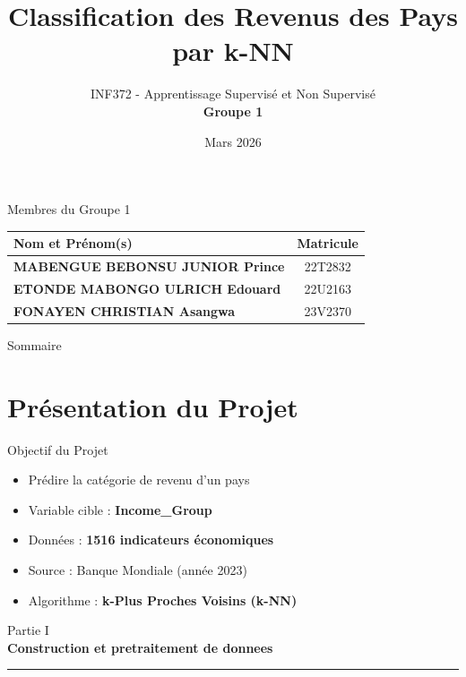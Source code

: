 \documentclass{beamer}
\title[Classification Income Group]{Classification des Revenus des Pays \\ par k-NN}
\author{INF372 - Apprentissage Supervisé et Non Supervisé \\ \textbf{Groupe 1}}
\institute{Université de Yaoundé 1 \\ Département d'Informatique}
\date{Mars 2026}
\begin{document}
\begin{frame}
\titlepage
\end{frame}

\begin{frame}{Membres du Groupe 1}
\centering
\vspace{0.4cm}
\begin{tabular}{>{\bfseries}l c}
\toprule
\textbf{Nom et Prénom(s)} & \textbf{Matricule} \\
\midrule
MABENGUE BEBONSU JUNIOR Prince   & 22T2832 \\[0.4cm]
ETONDE MABONGO ULRICH Edouard    & 22U2163 \\[0.4cm]
FONAYEN CHRISTIAN Asangwa        & 23V2370 \\
\bottomrule
\end{tabular}
\end{frame}

\begin{frame}{Sommaire}
\tableofcontents
\end{frame}


\section{Présentation du Projet}

\begin{frame}{Objectif du Projet}
\begin{itemize}
\item Prédire la catégorie de revenu d'un pays
\item Variable cible : \textbf{Income\_Group}
\item Données : \textbf{1516 indicateurs économiques}
\item Source : Banque Mondiale (année 2023)
\item Algorithme : \textbf{k-Plus Proches Voisins (k-NN)}
\end{itemize}
\end{frame}

\begin{frame}{}
\centering
\vspace{1.2cm}
{ Partie I}\\[0.5cm]
{\Large \textbf{Construction et pretraitement de donnees}}\\[0.3cm]
\rule{0.5\textwidth}{0.4pt}
\end{frame}
\end{document}
